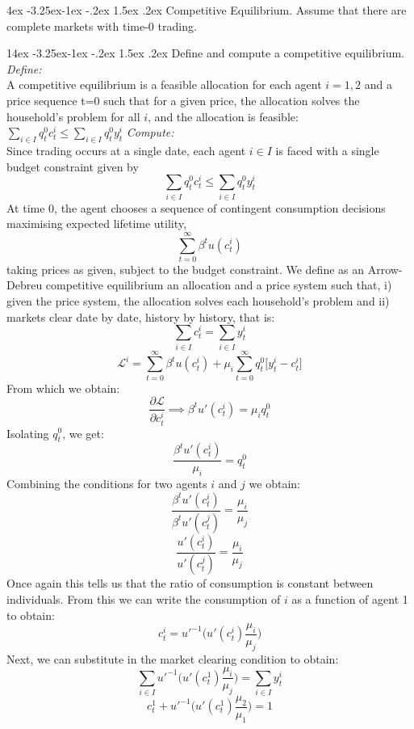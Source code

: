 \documentclass[10pt]{article}
\makeatletter
\newcommand{\bb}{\bigbreak\noindent}
\renewcommand\subsection{\leftskip 4ex\@startsection{subsection}{2}{\z@}%
	{-3.25ex\@plus -1ex \@minus -.2ex}%
	{1.5ex \@plus .2ex}%
	{\normalfont\large\bfseries}}
\renewcommand\subsubsection{\leftskip 14ex\@startsection{subsubsection}{3}{\z@}%
	{-3.25ex\@plus -1ex \@minus -.2ex}%
	{1.5ex \@plus .2ex}%
	{\normalfont\large\bfseries}}
\makeatother
\begin{document}
\begin{spacing}{1.5}
	
	
	\subsection{Competitive Equilibrium. Assume that there are complete markets with time-0 trading.}
		
		\subsubsection{Define and compute a competitive equilibrium.}
		\textit{Define:}\\
		 A competitive equilibrium is a feasible allocation for each agent $i = 1, 2$ and a price sequence
		t=0 such that for a given price, the allocation solves the household's problem for all $i$, and the allocation is feasible: $ \sum_{i\in I} q^0_t c^i_t \leq  \sum_{i\in I} q^0_t y^i_t $
		\bb
		\textit{Compute:}\\
		Since trading occurs at a single date, each agent $i \in I$ is faced with a single
		budget constraint given by
		\[ \sum_{i\in I} q^0_t c^i_t \leq  \sum_{i\in I} q^0_t y^i_t \]
		At time 0, the agent chooses a sequence of contingent consumption decisions maximising
		expected lifetime utility,
		\[ \sum_{t=0}^{\infty}\beta^t u(c^i_t) \]
		taking prices as given, subject to the budget constraint.
		\bb
		We define as an Arrow-Debreu competitive equilibrium an allocation and a price system such that, i) given the price system, the allocation solves each household's problem and ii) markets clear date by date, history by history, that is:
		\[ \sum_{i\in I}c^i_t =  \sum_{i\in I}y^i_t\]
		\bb
		\[ \mathcal{L}^i = \sum_{t=0}^{\infty} \beta^t u(c^i_t) + \mu_i\sum_{t=0}^{\infty}q^0_t\big[y^i_t - c_t^i\big]\]
		From which we obtain:
		\[ \frac{\partial \mathcal{L}}{\partial{c_t^i}} \implies \beta^t u'(c^i_t)=\mu_i q^0_t \] 
		Isolating $q^0_t$, we get:
		\[ \dfrac{\beta^t u'(c^i_t)}{\mu_i}=q^0_t \] 
		Combining the conditions for two agents $i$ and $j$ we obtain:
		\[ \dfrac{\beta^t u'(c^i_t)}{\beta^t u'(c^j_t)}=\frac{\mu_i }{\mu_j}\] 
		\[ \dfrac{u'(c^i_t)}{ u'(c^j_t)}=\frac{\mu_i }{\mu_j}\] 
		Once again this tells us that the ratio of consumption is constant between individuals.
		\bb
		From this we can write the consumption of $i$ as a function of agent 1 to obtain:
		\[ c^i_t = u'^{-1}\big(u'(c^i_t)\frac{\mu_i }{\mu_j}\big) \]
		Next, we can substitute in the market clearing condition to obtain:
		\[ \sum_{i\in I} u'^{-1}\big(u'(c^1_t)\frac{\mu_i }{\mu_j}\big) =  \sum_{i\in I} y^i_t \]
		\[  c^1_t+ u'^{-1}\big(u'(c^1_t)\frac{\mu_2 }{\mu_1}\big) = 1\]
		

\end{spacing}
\end{document}
